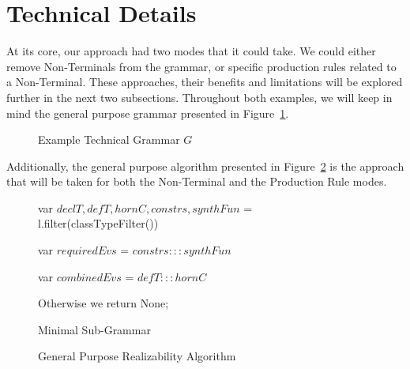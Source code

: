 \documentclass[acmsmall, nonacm]{acmart}
\begin{document}
\section{Technical Details}

At its core, our approach had two modes that it could take.
We could either remove Non-Terminals from the grammar, or
specific production rules related to a Non-Terminal.
These approaches, their benefits and limitations will
be explored further in the next two subsections.
Throughout both examples, we will keep in mind the general purpose grammar
presented in Figure~\ref{fig:Technical-Grammar}.


\begin{figure}[ht]
  \centering
  \caption{Example Technical Grammar $G$}
  \label{fig:Technical-Grammar}
\end{figure}

Additionally, the general purpose algorithm presented in Figure~\ref{fig:Algorithm} is the approach that will be taken for both
the Non-Terminal and the Production Rule modes.

\begin{figure}[H]
  \begin{algorithm}[H]
    \SetAlgoLined

    var $declT, defT, hornC, constrs, synthFun$ = l.filter(classTypeFilter())

    var $requiredEvs$ = $constrs ::: synthFun$

    var $combinedEvs$ = $defT ::: hornC$

    \BlankLine
    Otherwise we return None;

    \caption{Minimal Sub-Grammar}
  \end{algorithm}
  \caption{General Purpose Realizability Algorithm}
  \label{fig:Algorithm}
\end{figure}
\end{document}

